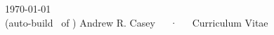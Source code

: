 \documentclass[11pt, a4paper]{awesome-cv}
\begin{document}
\makecvheader

\makecvfooter
  {\today\\(auto-build \githash\ of \giturl)}
  {Andrew R. Casey~~~·~~~Curriculum Vitae}
  {\thepage}






\clearpage



\clearpage



\clearpage



\end{document}
